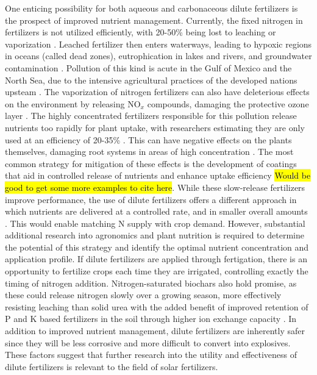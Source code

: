 One enticing possibility for both aqueous and carbonaceous dilute fertilizers is the prospect of improved nutrient management. Currently, the fixed nitrogen in fertilizers is not utilized efficiently, with 20-50\% being lost to leaching or vaporization \cite{Smil_1999_2, Naz_2016}. Leached fertilizer then enters waterways, leading to hypoxic regions in oceans (called dead zones), eutrophication in lakes and rivers, and groundwater contamination \cite{Diaz2008,Conley_2009,Shindo_2006}.  Pollution of this kind is acute in the Gulf of Mexico and the North Sea, due to the intensive agricultural practices of the developed nations upsteam \cite{Diaz2008,Conley_2009}. The vaporization of nitrogen fertilizers can also have deleterious effects on the environment by releasing NO$_x$ compounds, damaging the protective ozone layer \cite{Ravishankara_2009}. The highly concentrated fertilizers responsible for this pollution release nutrients too rapidly for plant uptake, with researchers estimating they are only used at an efficiency of 20-35\% \cite{Naz_2016}. This can have negative effects on the plants themselves, damaging root systems in areas of high concentration \cite{Morgan2009}. The most common strategy for mitigation of these effects is the development of coatings that aid in controlled release of nutrients and enhance uptake efficiency \cite{Naz_2016} \hl{Would be good to get some more examples to cite here}. While these slow-release fertilizers improve performance, the use of dilute fertilizers offers a different approach in which nutrients are delivered at a controlled rate, and in smaller overall amounts \cite{kadyampakeni_2015}. This would enable matching N supply with crop demand. However, substantial additional research into agronomics and plant nutrition is required to determine the potential of this strategy and identify the optimal nutrient concentration and application profile. If dilute fertilizers are applied through fertigation, there is an opportunity to fertilize crops each time they are irrigated, controlling exactly the timing of nitrogen addition. Nitrogen-saturated biochars also hold promise, as these could release nitrogen slowly over a growing season, more effectively resisting leaching than solid urea with the added benefit of improved retention of P and K based fertilizers in the soil through higher ion exchange capacity \cite{Glaser2002}. In addition to improved nutrient management, dilute fertilizers are inherently safer since they will be less corrosive and more difficult to convert into explosives. These factors suggest that further research into the utility and effectiveness of dilute fertilizers is relevant to the field of solar fertilizers.


